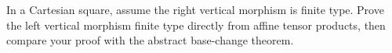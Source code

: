 \begin{problem}\label{chal:vi26-03}
In a Cartesian square, assume the right vertical morphism is finite type.  Prove the left vertical morphism finite type directly from affine tensor products, then compare your proof with the abstract base-change theorem.
\end{problem}
